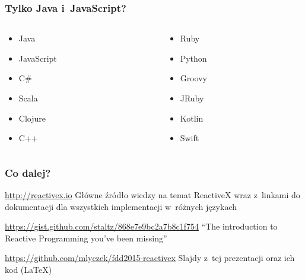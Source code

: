 \documentclass[24pt,handout]{beamer}
\begin{document}
\begin{frame}
    \frametitle{Tylko Java i~JavaScript?}

    \begin{columns}
        \begin{column}{.5\textwidth}
            \begin{itemize}
                \item Java
                \item JavaScript
                \item C\#
                \item Scala
                \item Clojure
                \item C++
            \end{itemize}
        \end{column}
        \begin{column}{.5\textwidth}
            \begin{itemize}
                \item Ruby
                \item Python
                \item Groovy
                \item JRuby
                \item Kotlin
                \item Swift
            \end{itemize}
        \end{column}
    \end{columns}
\end{frame}

\begin{frame}
    \frametitle{Co dalej?}

    \begin{block}{\url{http://reactivex.io}}
        Główne źródło wiedzy na temat ReactiveX wraz z~linkami do dokumentacji dla wszystkich implementacji w~różnych językach
    \end{block}

    \begin{block}{\url{https://gist.github.com/staltz/868e7e9bc2a7b8c1f754}}
        ``The introduction to Reactive Programming you've been missing''
    \end{block}

    \begin{block}{\url{https://github.com/mlyczek/fdd2015-reactivex}}
        Slajdy z~tej prezentacji oraz ich kod (\LaTeX)
    \end{block}

\end{frame}
\end{document}
